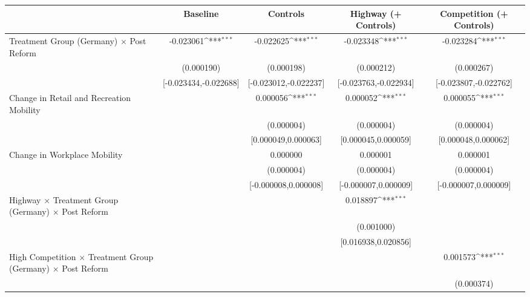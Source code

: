 {
\def\sym#1{\ifmmode^{#1}\else\(^{#1}\)\fi}
\begin{tabular}{l*{4}{c}}
\toprule
                    &\multicolumn{1}{c}{Baseline}&\multicolumn{1}{c}{Controls}&\multicolumn{1}{c}{Highway (+ Controls)}&\multicolumn{1}{c}{Competition (+ Controls)}\\
\midrule
Treatment Group (Germany) $\times$ Post Reform&   -0.023061\sym{***}&   -0.022625\sym{***}&   -0.023348\sym{***}&   -0.023284\sym{***}\\
                    &  (0.000190)         &  (0.000198)         &  (0.000212)         &  (0.000267)         \\
                    &[-0.023434,-0.022688]         &[-0.023012,-0.022237]         &[-0.023763,-0.022934]         &[-0.023807,-0.022762]         \\
Change in Retail and Recreation Mobility&                     &    0.000056\sym{***}&    0.000052\sym{***}&    0.000055\sym{***}\\
                    &                     &  (0.000004)         &  (0.000004)         &  (0.000004)         \\
                    &                     &[0.000049,0.000063]         &[0.000045,0.000059]         &[0.000048,0.000062]         \\
Change in Workplace Mobility&                     &    0.000000         &    0.000001         &    0.000001         \\
                    &                     &  (0.000004)         &  (0.000004)         &  (0.000004)         \\
                    &                     &[-0.000008,0.000008]         &[-0.000007,0.000009]         &[-0.000007,0.000009]         \\
Highway $\times$ Treatment Group (Germany) $\times$ Post Reform&                     &                     &    0.018897\sym{***}&                     \\
                    &                     &                     &  (0.001000)         &                     \\
                    &                     &                     &[0.016938,0.020856]         &                     \\
High Competition $\times$ Treatment Group (Germany) $\times$ Post Reform&                     &                     &                     &    0.001573\sym{***}\\
                    &                     &                     &                     &  (0.000374)         \\

\end{tabular}}

